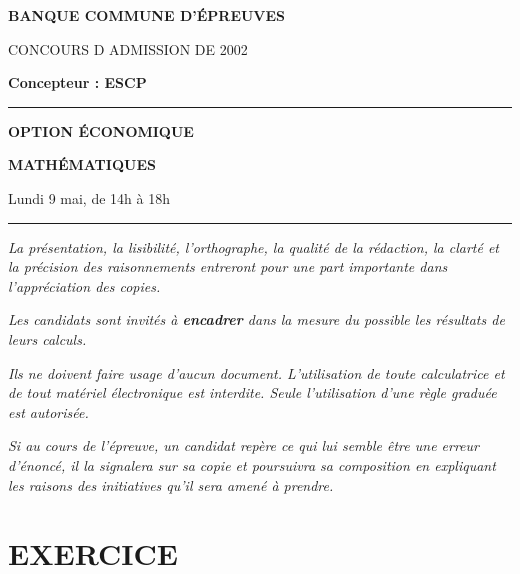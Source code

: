 \documentclass[11pt]{article}%
\begin{document}

\begin{center}
{\LARG\E\textbf{BANQUE COMMUNE D'ÉPREUVES}}



{\large \textsc{CONCOURS D ADMISSION DE 2002}}



{\large \textbf{Concepteur : ESCP}}



\rule{2.39cm}{0.05cm}



{\Large \textbf{OPTION ÉCONOMIQUE}}



{\Large \textbf{MATHÉMATIQUES }}



{\Large Lundi 9 mai, de 14h à 18h}



\rule{2.39cm}{0.05cm}
\end{center}

\textit{La présentation, la lisibilité, l'orthographe, la qualité
de la rédaction, la clarté et la précision des raisonnements
entreront pour une part importante dans l'appréciation des copies.}

\textit{Les candidats sont invités à \textbf{encadrer} dans la mesure
du possible les résultats de leurs calculs.}

\textit{Ils ne doivent faire usage d'aucun document. L'utilisation de
toute
calculatrice et de tout matériel électronique est interdite. Seule
l'utilisation d'une règle graduée est autorisée.}

\textit{Si au cours de l'épreuve, un candidat repère ce qui lui semble
être une erreur d'énoncé, il la signalera sur sa copie et
poursuivra sa composition en expliquant les raisons des initiatives
qu'il sera
amené à prendre.}

\vspace*{3cm}

\section*{EXERCICE}
\end{document}
